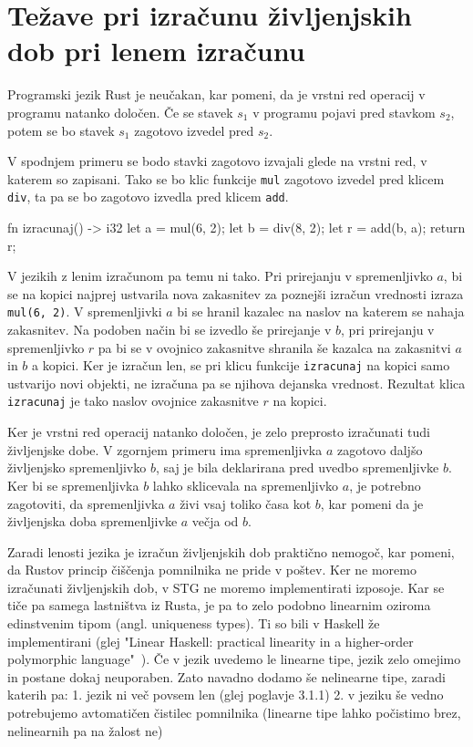 \chapter[Življenjske dobe in leni izračun]{Težave pri izračunu življenjskih dob pri lenem izračunu}

Programski jezik Rust je neučakan, kar pomeni, da je vrstni red operacij v programu natanko določen. Če se stavek $s_1$ v programu pojavi pred stavkom $s_2$, potem se bo stavek $s_1$ zagotovo izvedel pred $s_2$.

V spodnjem primeru se bodo stavki zagotovo izvajali glede na vrstni red, v katerem so zapisani. Tako se bo klic funkcije \texttt{mul} zagotovo izvedel pred klicem \texttt{div}, ta pa se bo zagotovo izvedla pred klicem \texttt{add}.

\begin{rust-success}
fn izracunaj() -> i32 {
    let a = mul(6, 2);
    let b = div(8, 2);
    let r = add(b, a);
    return r;
}
\end{rust-success}

V jezikih z lenim izračunom pa temu ni tako. Pri prirejanju v spremenljivko $a$, bi se na kopici najprej ustvarila nova zakasnitev za poznejši izračun vrednosti izraza \texttt{mul(6, 2)}. V spremenljivki $a$ bi se hranil kazalec na naslov na katerem se nahaja zakasnitev. Na podoben način bi se izvedlo še prirejanje v $b$, pri prirejanju v spremenljivko $r$ pa bi se v ovojnico zakasnitve shranila še kazalca na zakasnitvi $a$ in $b$ a kopici. Ker je izračun len, se pri klicu funkcije \texttt{izracunaj} na kopici samo ustvarijo novi objekti, ne izračuna pa se njihova dejanska vrednost. Rezultat klica \texttt{izracunaj} je tako naslov ovojnice zakasnitve $r$ na kopici. 

Ker je vrstni red operacij natanko določen, je zelo preprosto izračunati tudi življenjske dobe. V zgornjem primeru ima spremenljivka $a$ zagotovo daljšo življenjsko spremenljivko $b$, saj je bila deklarirana pred uvedbo spremenljivke $b$. Ker bi se spremenljivka $b$ lahko sklicevala na spremenljivko $a$, je potrebno zagotoviti, da spremenljivka $a$ živi vsaj toliko časa kot $b$, kar pomeni da je življenjska doba spremenljivke $a$ večja od $b$.

Zaradi lenosti jezika je izračun življenjskih dob praktično nemogoč, kar pomeni, da Rustov princip čiščenja pomnilnika ne pride v poštev. Ker ne moremo izračunati življenjskih dob, v STG ne moremo implementirati izposoje. Kar se tiče pa samega lastništva iz Rusta, je pa to zelo podobno linearnim oziroma edinstvenim tipom (angl. uniqueness types). Ti so bili v Haskell že implementirani (glej "Linear Haskell: practical linearity in a higher-order polymorphic language"~\cite{bernardy2018linear}). Če v jezik uvedemo le linearne tipe, jezik zelo omejimo in postane dokaj neuporaben. Zato navadno dodamo še nelinearne tipe, zaradi katerih pa: 1. jezik ni več povsem len (glej poglavje 3.1.1) 2. v jeziku še vedno potrebujemo avtomatičen čistilec pomnilnika (linearne tipe lahko počistimo brez, nelinearnih pa na žalost ne)